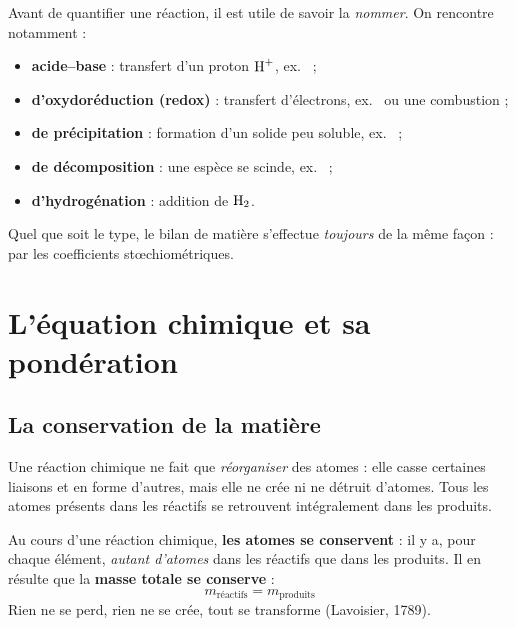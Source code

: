 \documentclass[11pt,a4paper]{article}
\begin{document}
\begin{remarque}
Avant de quantifier une réaction, il est utile de savoir la \emph{nommer}. On rencontre notamment :
\begin{itemize}[leftmargin=1.6em,topsep=2pt,itemsep=1pt]
  \item \textbf{acide–base} : transfert d'un proton $\ce{H+}$, ex.\  ;
  \item \textbf{d'oxydoréduction (redox)} : transfert d'électrons, ex.\  ou une combustion ;
  \item \textbf{de précipitation} : formation d'un solide peu soluble, ex.\  ;
  \item \textbf{de décomposition} : une espèce se scinde, ex.\  ;
  \item \textbf{d'hydrogénation} : addition de $\ce{H2}$.
\end{itemize}
Quel que soit le type, le bilan de matière s'effectue \emph{toujours} de la même façon : par les
coefficients stœchiométriques.
\end{remarque}

\section{L'équation chimique et sa pondération}
\label{sec:equation}
\subsection{La conservation de la matière}

Une réaction chimique ne fait que \emph{réorganiser} des atomes : elle casse certaines liaisons et
en forme d'autres, mais elle ne crée ni ne détruit d'atomes. Tous les atomes présents dans les
réactifs se retrouvent intégralement dans les produits.

\begin{theoreme}
Au cours d'une réaction chimique, \textbf{les atomes se conservent} : il y a, pour chaque élément,
\emph{autant d'atomes} dans les réactifs que dans les produits. Il en résulte que la
\textbf{masse totale se conserve} :
\[
\boxed{\;m_{\text{réactifs}} = m_{\text{produits}}\;}
\]
\og Rien ne se perd, rien ne se crée, tout se transforme \fg{} (Lavoisier, 1789).
\end{theoreme}
\end{document}
